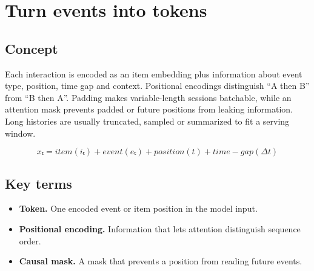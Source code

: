 \section{Turn events into tokens}

\begin{abstract}
Identity, action, position and time become the input sequence.
\end{abstract}

\subsection{Concept}
Each interaction is encoded as an item embedding plus information about event type, position, time gap and context. Positional encodings distinguish “A then B” from “B then A”. Padding makes variable-length sessions batchable, while an attention mask prevents padded or future positions from leaking information. Long histories are usually truncated, sampled or summarized to fit a serving window.

\begin{equation*}
xₜ = item(iₜ) + event(eₜ) + position(t) + time-gap(Δt)
\end{equation*}

\subsection{Key terms}
\begin{itemize}
\item \textbf{Token.} One encoded event or item position in the model input.
\item \textbf{Positional encoding.} Information that lets attention distinguish sequence order.
\item \textbf{Causal mask.} A mask that prevents a position from reading future events.
\end{itemize}
